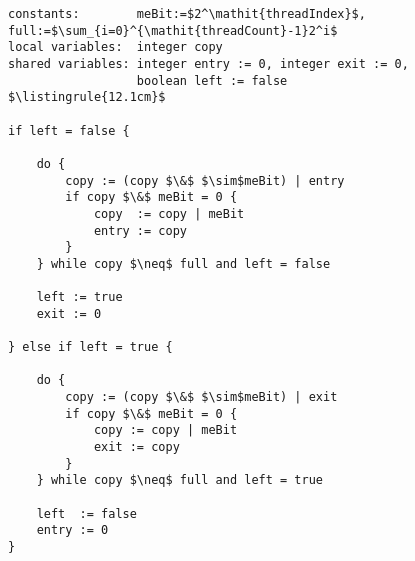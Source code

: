 \begin{center}
\begin{minipage}{\textwidth}
\begin{lstlisting}[mathescape, linewidth=12.1cm]
constants:        meBit:=$2^\mathit{threadIndex}$, full:=$\sum_{i=0}^{\mathit{threadCount}-1}2^i$
local variables:  integer copy
shared variables: integer entry := 0, integer exit := 0,
                  boolean left := false
$\listingrule{12.1cm}$

if left = false {

	do {
		copy := (copy $\&$ $\sim$meBit) | entry
		if copy $\&$ meBit = 0 {
			copy  := copy | meBit
			entry := copy
		}
	} while copy $\neq$ full and left = false

	left := true
	exit := 0

} else if left = true {

	do {
		copy := (copy $\&$ $\sim$meBit) | exit
		if copy $\&$ meBit = 0 {
			copy := copy | meBit
			exit := copy
		}
	} while copy $\neq$ full and left = true

	left  := false
	entry := 0
}
\end{lstlisting}
\end{minipage}
\end{center}
